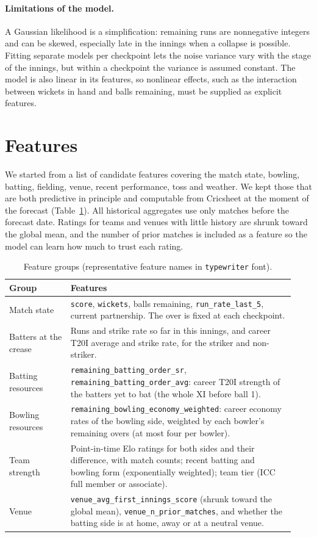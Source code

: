\documentclass{article}
\newcommand{\1}{\mathbf{1}}
\begin{document}
\paragraph{Limitations of the model.} A Gaussian likelihood is a simplification: remaining runs are nonnegative integers and can be skewed, especially late in the innings when a collapse is possible. Fitting separate models per checkpoint lets the noise variance vary with the stage of the innings, but within a checkpoint the variance is assumed constant. The model is also linear in its features, so nonlinear effects, such as the interaction between wickets in hand and balls remaining, must be supplied as explicit features.

\section{Features}\label{sec:features}
We started from a list of candidate features covering the match state, bowling, batting, fielding, venue, recent performance, toss and weather. We kept those that are both predictive in principle and computable from Cricsheet at the moment of the forecast (Table~\ref{tab:features}). All historical aggregates use only matches before the forecast date. Ratings for teams and venues with little history are shrunk toward the global mean, and the number of prior matches is included as a feature so the model can learn how much to trust each rating.

\begin{table}[h]
\centering
\caption{Feature groups (representative feature names in \texttt{typewriter} font).}
\label{tab:features}
\small
\begin{tabular}{>{\raggedright\arraybackslash}p{0.2\linewidth}>{\raggedright\arraybackslash}p{0.73\linewidth}}
\toprule
Group & Features \\
\midrule
Match state & \texttt{score}, \texttt{wickets}, balls remaining, \texttt{run\_rate\_last\_5}, current partnership. The over is fixed at each checkpoint. \\
Batters at the crease & Runs and strike rate so far in this innings, and career T20I average and strike rate, for the striker and non-striker. \\
Batting resources & \texttt{remaining\_batting\_order\_sr}, \texttt{remaining\_batting\_order\_avg}: career T20I strength of the batters yet to bat (the whole XI before ball 1). \\
Bowling resources & \texttt{remaining\_bowling\_economy\_weighted}: career economy rates of the bowling side, weighted by each bowler's remaining overs (at most four per bowler). \\
Team strength & Point-in-time Elo ratings \citep{elo1978} for both sides and their difference, with match counts; recent batting and bowling form (exponentially weighted); team tier (ICC full member or associate). \\
Venue & \texttt{venue\_avg\_first\_innings\_score} (shrunk toward the global mean), \texttt{venue\_n\_prior\_matches}, and whether the batting side is at home, away or at a neutral venue. \\
\bottomrule
\end{tabular}
\end{table}
\end{document}
